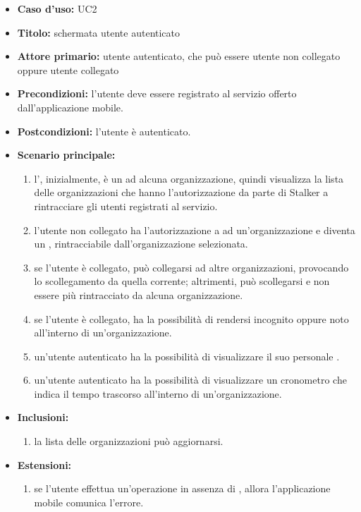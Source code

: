 \documentclass[casi-duso]{subfiles}
\begin{document}
\begin{itemize}
  \item \textbf{Caso d’uso:} UC2
  \item \textbf{Titolo:} schermata utente autenticato
  \item \textbf{Attore primario:} utente autenticato, che può essere utente non collegato oppure utente collegato
  \item \textbf{Precondizioni:} l'utente deve essere registrato al servizio offerto dall'applicazione mobile.
  \item \textbf{Postcondizioni:} l'utente è autenticato.
  \item \textbf{Scenario principale:} 
  \begin{enumerate}
    \item l', inizialmente, è un  ad alcuna organizzazione, quindi visualizza la lista delle organizzazioni che hanno 
    l'autorizzazione da parte di Stalker a rintracciare gli utenti registrati al servizio.
    \item l'utente non collegato ha l'autorizzazione a  ad un'organizzazione e diventa un , rintracciabile dall'organizzazione selezionata.
    \item se l'utente è collegato, può collegarsi ad altre organizzazioni, provocando lo scollegamento da quella corrente; altrimenti, può scollegarsi e non essere più rintracciato da
    alcuna organizzazione.
    \item se l'utente è collegato, ha la possibilità di rendersi incognito oppure noto all'interno di un'organizzazione.
    \item un'utente autenticato ha la possibilità di visualizzare il suo personale .
    \item un'utente autenticato ha la possibilità di visualizzare un cronometro che indica il tempo trascorso all'interno di un'organizzazione.
  \end{enumerate}
  \item \textbf{Inclusioni:}
  \begin{enumerate}
    \item la lista delle organizzazioni può aggiornarsi.
  \end{enumerate}
  \item \textbf{Estensioni:} 
  \begin{enumerate}
    \item se l'utente effettua un'operazione in assenza di , allora l'applicazione mobile comunica l'errore.
  \end{enumerate}
\end{itemize}
\end{document}
